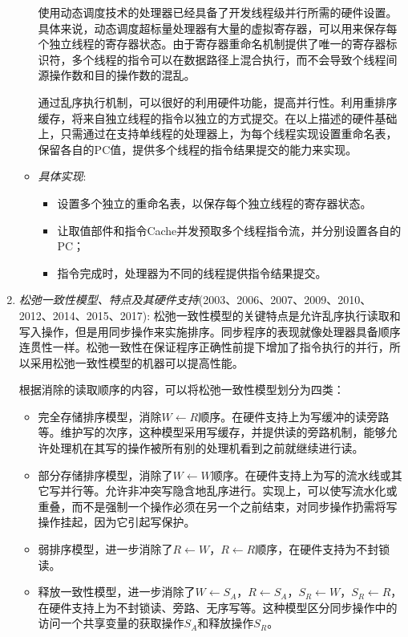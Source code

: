 \documentclass[a4paper]{ctexart}
\begin{document}
\begin{enumerate}
\begin{itemize}
    使用动态调度技术的处理器已经具备了开发线程级并行所需的硬件设置。具体来说，动态调度超标量处理器有大量的虚拟寄存器，可以用来保存每个独立线程的寄存器状态。由于寄存器重命名机制提供了唯一的寄存器标识符，多个线程的指令可以在数据路径上混合执行，而不会导致个线程间源操作数和目的操作数的混乱。
    
    通过乱序执行机制，可以很好的利用硬件功能，提高并行性。利用重排序缓存，将来自独立线程的指令以独立的方式提交。在以上描述的硬件基础上，只需通过在支持单线程的处理器上，为每个线程实现设置重命名表，保留各自的PC值，提供多个线程的指令结果提交的能力来实现。
    
    \item \emph{具体实现}:
    \begin{itemize}
      \item 设置多个独立的重命名表，以保存每个独立线程的寄存器状态。
      \item 让取值部件和指令Cache并发预取多个线程指令流，并分别设置各自的PC；
      \item 指令完成时，处理器为不同的线程提供指令结果提交。
    \end{itemize}
  \end{itemize}

  \item \emph{松弛一致性模型、特点及其硬件支持}(2003、2006、2007、2009、2010、2012、2014、2015、2017):
  松弛一致性模型的关键特点是允许乱序执行读取和写入操作，但是用同步操作来实施排序。同步程序的表现就像处理器具备顺序连贯性一样。松弛一致性在保证程序正确性前提下增加了指令执行的并行，所以采用松弛一致性模型的机器可以提高性能。
  
  根据消除的读取顺序的内容，可以将松弛一致性模型划分为四类：
  \begin{itemize}
    \item 完全存储排序模型，消除$W\leftarrow R$顺序。在硬件支持上为写缓冲的读旁路等。维护写的次序，这种模型采用写缓存，并提供读的旁路机制，能够允许处理机在其写的操作被所有别的处理机看到之前就继续进行读。
    \item 部分存储排序模型，消除了$W\leftarrow W$顺序。在硬件支持上为写的流水线或其它写并行等。允许非冲突写隐含地乱序进行。实现上，可以使写流水化或重叠，而不是强制一个操作必须在另一个之前结束，对同步操作扔需将写操作挂起，因为它引起写保护。
    \item 弱排序模型，进一步消除了$R\leftarrow W$，$R\leftarrow R$顺序，在硬件支持为不封锁读。
    \item 释放一致性模型，进一步消除了$W\leftarrow S_A$，$R\leftarrow S_A$，$S_R\leftarrow W$，$S_R\leftarrow R$，在硬件支持上为不封锁读、旁路、无序写等。这种模型区分同步操作中的访问一个共享变量的获取操作$S_A$和释放操作$S_R$。
  \end{itemize}
  

\end{enumerate}
\end{document}
